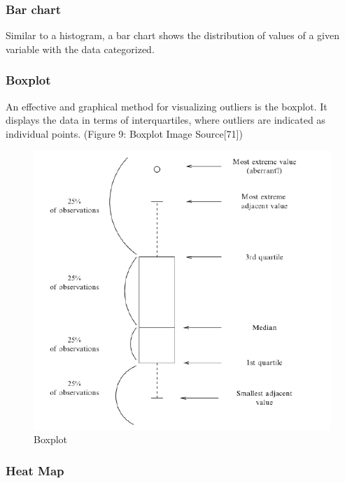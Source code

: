 \documentclass[11pt,a4paper]{article}
\begin{document}
\subsubsection{Bar chart}\label{bar-chart}

Similar to a histogram, a bar chart shows the distribution of values of
a given variable with the data categorized.

\subsubsection{Boxplot}\label{boxplot}

An effective and graphical method for visualizing outliers is the
boxplot. It displays the data in terms of interquartiles, where outliers
are indicated as individual points. (Figure 9: Boxplot Image
Source{[}71{]})

\begin{figure}

{\centering \includegraphics{thesis_files/figure-latex/unnamed-chunk-15-1} 

}

\caption{Boxplot}\label{fig:unnamed-chunk-15}
\end{figure}

\subsubsection{Heat Map}\label{heat-map}
\end{document}
